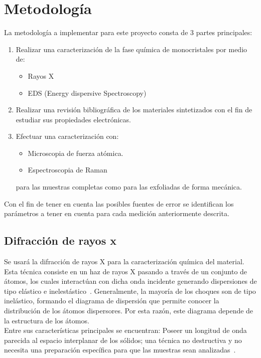 \documentclass{article}
\begin{document}
\section{Metodología}
La metodología a implementar para este proyecto consta de 3 partes principales:
\begin{enumerate}
    \item Realizar una caracterización de la fase química de monocristales por medio de:
    \begin{itemize}
        \item Rayos X
        \item EDS (Energy dispersive Spectroscopy)
    \end{itemize}
    \item Realizar una revisión bibliográfica de los materiales sintetizados con el fin de estudiar sus propiedades electrónicas.
    \item Efectuar una caracterización con:
    \begin{itemize}
        \item Microscopia de fuerza atómica.
        \item Espectroscopia de Raman
    \end{itemize}
    para las muestras completas como para las exfoliadas de forma mecánica.
\end{enumerate}
Con el fin de tener en cuenta las posibles fuentes de error se identifican los parámetros a tener en cuenta para cada medición anteriormente descrita.

\subsection{Difracción de rayos x}

Se usará la difracción de rayos X para la caracterización química del material. Esta técnica consiste en un haz de rayos X pasando a través de un conjunto de átomos, los cuales interactúan con dicha onda incidente generando dispersiones de tipo elástico e inelestástico~\cite{xrays}. Generalmente, la mayoría de los choques son de tipo inelástico, formando el diagrama de dispersión que permite conocer la distribución de los átomos dispersores. Por esta razón, este diagrama depende de la estructura de los átomos.\\

Entre sus características principales se encuentran: Poseer un longitud de onda parecida al espacio interplanar de los sólidos; una técnica no destructiva y no necesita una preparación específica para que las muestras sean analizadas~\cite{xrays}. 
\end{document}
